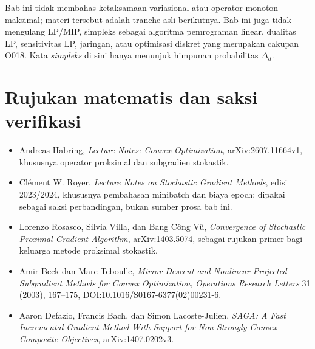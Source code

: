 Bab ini tidak membahas ketaksamaan variasional atau operator monoton maksimal;
materi tersebut adalah tranche asli berikutnya. Bab ini juga tidak mengulang
LP/MIP, simpleks sebagai algoritma pemrograman linear, dualitas LP, sensitivitas
LP, jaringan, atau optimisasi diskret yang merupakan cakupan O018. Kata
\emph{simpleks} di sini hanya menunjuk himpunan probabilitas $\Delta_d$.

\section*{Rujukan matematis dan saksi verifikasi}
\begingroup\sloppy
\begin{itemize}
  \item Andreas Habring, \emph{Lecture Notes: Convex Optimization},
    arXiv:2607.11664v1, khususnya operator proksimal dan subgradien stokastik.
  \item Cl\'ement W. Royer, \emph{Lecture Notes on Stochastic Gradient
    Methods}, edisi 2023/2024, khususnya pembahasan minibatch dan biaya epoch;
    dipakai sebagai saksi perbandingan, bukan sumber prosa bab ini.
  \item Lorenzo Rosasco, Silvia Villa, dan Bang C\^ong V\~u,
    \emph{Convergence of Stochastic Proximal Gradient Algorithm},
    arXiv:1403.5074, sebagai rujukan primer bagi keluarga metode proksimal
    stokastik.
  \item Amir Beck dan Marc Teboulle, \emph{Mirror Descent and Nonlinear
    Projected Subgradient Methods for Convex Optimization},
    \emph{Operations Research Letters} 31 (2003), 167--175,
    DOI:10.1016/S0167-6377(02)00231-6.
  \item Aaron Defazio, Francis Bach, dan Simon Lacoste-Julien,
    \emph{SAGA: A Fast Incremental Gradient Method With Support for
    Non-Strongly Convex Composite Objectives}, arXiv:1407.0202v3.
\end{itemize}
\endgroup
